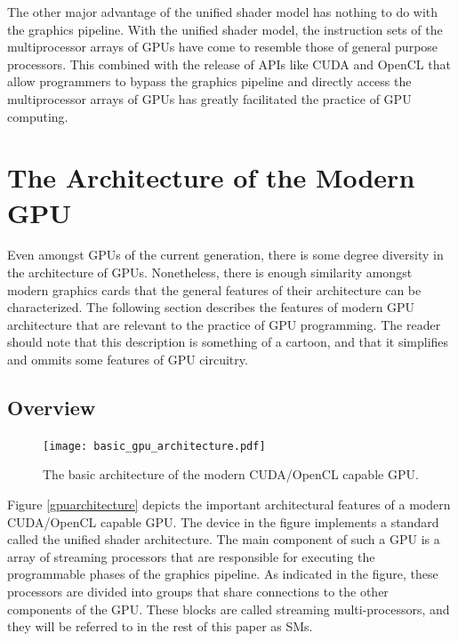 \documentclass[12pt,twoside]{reedthesis}
\begin{document}
The other major advantage of the unified shader model has nothing to do with the graphics pipeline. With the unified shader model, the instruction sets of the multiprocessor arrays of GPUs have come to resemble those of general purpose processors. This combined with the release of APIs like CUDA and OpenCL that allow programmers to bypass the graphics pipeline and directly access the multiprocessor arrays of GPUs has greatly facilitated the practice of GPU computing.

\section{The Architecture of the Modern GPU}

Even amongst GPUs of the current generation, there is some degree diversity in the architecture of GPUs. Nonetheless, there is enough similarity amongst modern graphics cards that the general features of their architecture can be characterized. The following section describes the features of modern GPU architecture that are relevant to the practice of GPU programming. The reader should note that this description is something of a cartoon, and that it simplifies and ommits some features of GPU circuitry.

\subsection{Overview}

\begin{center}
\begin{figure}[h!]
\texttt{[image: basic\_gpu\_architecture.pdf]}
\caption{The basic architecture of the modern CUDA/OpenCL capable GPU.}
\end{figure}
\label{gpuarchitecture}
\vspace{1pc}
\end{center}

Figure \ref{gpuarchitecture} depicts the important architectural features of a modern CUDA/OpenCL capable GPU. The device in the figure implements a standard called the unified shader architecture. The main component of such a GPU is a array of streaming processors that are responsible for executing the programmable phases of the graphics pipeline. As indicated in the figure, these processors are divided into groups that share connections to the other components of the GPU. These blocks are called streaming multi-processors, and they will be referred to in the rest of this paper as SMs.
\end{document}
